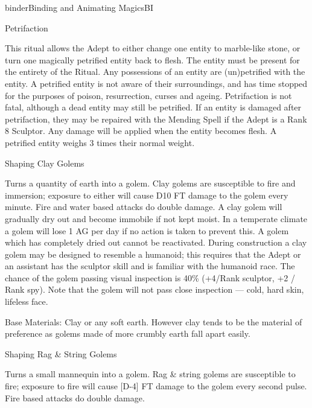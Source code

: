 \begin{College}[1.2]{binder}{Binding and Animating Magics}{BI}
\begin{ritual}[Q-2]{Petrifaction}
\begin{effects}
This ritual allows the Adept to either change one entity to
marble-like stone, or turn one magically petrified entity back to
flesh.  The entity must be present for the entirety of the Ritual.
Any possessions of an entity are (un)petrified with the entity.  A
petrified entity is not aware of their surroundings, and has time
stopped for the purposes of poison, resurrection, curses and
ageing. Petrifaction is not fatal, although a dead entity may still be
petrified. If an entity is damaged after petrifaction, they may be
repaired with the Mending Spell if the Adept is a Rank 8 Sculptor.
Any damage will be applied when the entity becomes flesh. A petrified
entity weighs 3 times their normal weight.
\end{effects}
\end{ritual}

\begin{ritual}[Q-3]{Shaping Clay Golems}
\begin{effects}
Turns a quantity of earth into a golem.  Clay golems are susceptible
to fire and immersion; exposure to either will cause D10 FT damage to
the golem every minute.  Fire and water based attacks do double
damage.  A clay golem will gradually dry out and become immobile if
not kept moist.  In a temperate climate a golem will lose 1 AG per day
if no action is taken to prevent this. A golem which has completely
dried out cannot be reactivated. During construction a clay golem may
be designed to resemble a humanoid; this requires that the Adept or an
assistant has the sculptor skill and is familiar with the humanoid
race. The chance of the golem passing visual inspection is 40\%
(+4/Rank sculptor, +2 / Rank spy).  Note that the golem will not pass
close inspection — cold, hard skin, lifeless face.

Base Materials: Clay or any soft earth.  However clay tends to be the
material of preference as golems made of more crumbly earth fall apart
easily.
\end{effects}
\end{ritual}

\begin{ritual}[Q-4]{Shaping Rag \& String Golems}
\begin{effects}
Turns a small mannequin into a golem.  Rag \& string golems are
susceptible to fire; exposure to fire will cause [D-4] FT damage to
the golem every second pulse.  Fire based attacks do double damage.


\end{effects}
\end{ritual}
\end{College}
